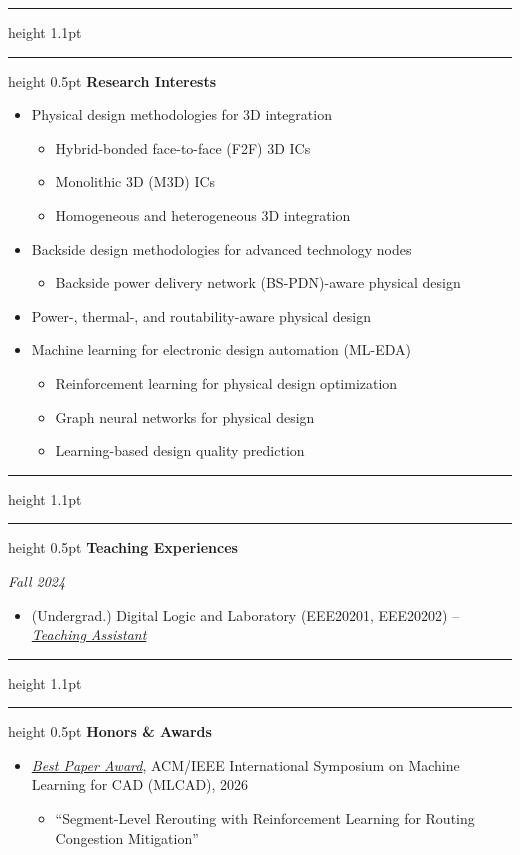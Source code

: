 \documentclass[11pt,a4paper]{article}
\newcommand{\doublerule}{%
  \par\vspace{8pt}%
  \hrule height 1.1pt\vspace{1.6pt}\hrule height 0.5pt%
  \vspace{3pt}}
\newcommand{\sect}[1]{\doublerule\textbf{#1}\par\vspace{1pt}}
\newcommand{\role}[1]{\uline{\textit{#1}}}
\newcommand{\term}[1]{\par\textit{#1}\par}
\begin{document}
\sect{Research Interests}
\begin{itemize}
  \item Physical design methodologies for 3D integration
  \begin{itemize}
    \item Hybrid-bonded face-to-face (F2F) 3D ICs
    \item Monolithic 3D (M3D) ICs
    \item Homogeneous and heterogeneous 3D integration
  \end{itemize}
  \item Backside design methodologies for advanced technology nodes
  \begin{itemize}
    \item Backside power delivery network (BS-PDN)-aware physical design
  \end{itemize}
  \item Power-, thermal-, and routability-aware physical design
  \item Machine learning for electronic design automation (ML-EDA)
  \begin{itemize}
    \item Reinforcement learning for physical design optimization
    \item Graph neural networks for physical design
    \item Learning-based design quality prediction
  \end{itemize}
\end{itemize}

\sect{Teaching Experiences}
\term{Fall 2024}
\begin{itemize}
  \item (Undergrad.) Digital Logic and Laboratory (EEE20201, EEE20202) -- \role{Teaching Assistant}
\end{itemize}

\sect{Honors \& Awards}
\begin{itemize}
  \item \role{Best Paper Award}, ACM/IEEE International Symposium on Machine Learning for CAD (MLCAD), 2026
  \begin{itemize}
    \item ``Segment-Level Rerouting with Reinforcement Learning for Routing Congestion Mitigation''
  \end{itemize}
\end{itemize}
\end{document}
